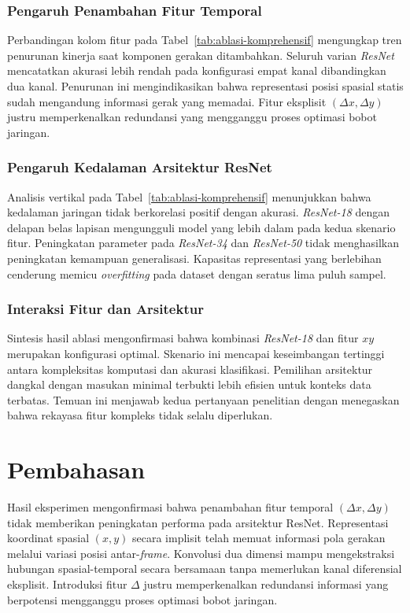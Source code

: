 \subsubsection{Pengaruh Penambahan Fitur Temporal}
\label{subsubsec:ablasi-fitur-temporal}
Perbandingan kolom fitur pada Tabel~\ref{tab:ablasi-komprehensif} mengungkap tren penurunan kinerja saat komponen gerakan ditambahkan.
Seluruh varian \textit{ResNet} mencatatkan akurasi lebih rendah pada konfigurasi empat kanal dibandingkan dua kanal.
Penurunan ini mengindikasikan bahwa representasi posisi spasial statis sudah mengandung informasi gerak yang memadai.
Fitur eksplisit $(\Delta x, \Delta y)$ justru memperkenalkan redundansi yang mengganggu proses optimasi bobot jaringan.

\subsubsection{Pengaruh Kedalaman Arsitektur ResNet}
\label{subsubsec:ablasi-kedalaman}
Analisis vertikal pada Tabel~\ref{tab:ablasi-komprehensif} menunjukkan bahwa kedalaman jaringan tidak berkorelasi positif dengan akurasi.
\textit{ResNet-18} dengan delapan belas lapisan mengungguli model yang lebih dalam pada kedua skenario fitur.
Peningkatan parameter pada \textit{ResNet-34} dan \textit{ResNet-50} tidak menghasilkan peningkatan kemampuan generalisasi.
Kapasitas representasi yang berlebihan cenderung memicu \textit{overfitting} pada dataset dengan seratus lima puluh sampel.

\subsubsection{Interaksi Fitur dan Arsitektur}
\label{subsubsec:ablasi-interaksi}
Sintesis hasil ablasi mengonfirmasi bahwa kombinasi \textit{ResNet-18} dan fitur $xy$ merupakan konfigurasi optimal.
Skenario ini mencapai keseimbangan tertinggi antara kompleksitas komputasi dan akurasi klasifikasi.
Pemilihan arsitektur dangkal dengan masukan minimal terbukti lebih efisien untuk konteks data terbatas.
Temuan ini menjawab kedua pertanyaan penelitian dengan menegaskan bahwa rekayasa fitur kompleks tidak selalu diperlukan.

\section{Pembahasan}
\label{sec:pembahasan}
Hasil eksperimen mengonfirmasi bahwa penambahan fitur temporal $(\Delta x, \Delta y)$ tidak memberikan peningkatan performa pada arsitektur ResNet.
Representasi koordinat spasial $(x, y)$ secara implisit telah memuat informasi pola gerakan melalui variasi posisi antar-\textit{frame}.
Konvolusi dua dimensi mampu mengekstraksi hubungan spasial-temporal secara bersamaan tanpa memerlukan kanal diferensial eksplisit.
Introduksi fitur $\Delta$ justru memperkenalkan redundansi informasi yang berpotensi mengganggu proses optimasi bobot jaringan.

